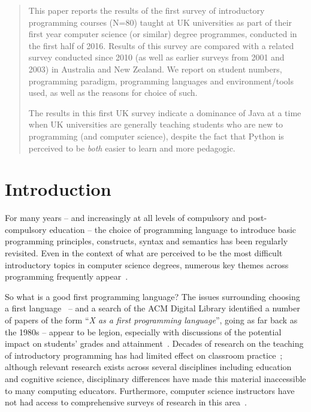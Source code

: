 \documentclass{sig-alternate}
\begin{document}
\maketitle

\begin{abstract}
This paper reports the results of the first survey of introductory
programming courses (N=80) taught at UK universities as part of their
first year computer science (or similar) degree programmes, conducted
in the first half of 2016. Results of this survey are compared with a
related survey conducted since 2010 (as well as earlier surveys from
2001 and 2003) in Australia and New Zealand. We report on student
numbers, programming paradigm, programming languages and
environment/tools used, as well as the reasons for choice of such.

The results in this first UK survey indicate a dominance of Java at a
time when UK universities are generally teaching students who are new
to programming (and computer science), despite the fact that Python is
perceived to be \emph{both} easier to learn and more pedagogic.

\end{abstract}


\section{Introduction}\label{intro}

For many years -- and increasingly at all levels of compulsory and
post-compulsory education -- the choice of programming language to
introduce basic programming principles, constructs, syntax and
semantics has been regularly revisited. Even in the context of what
are perceived to be the most difficult introductory topics in computer
science degrees, numerous key themes across programming frequently
appear~\cite{dale:2006}. 

So what is a good first programming language? The issues surrounding
choosing a first language~\cite{gupta:2004,kaplan:2010} -- and a
search of the ACM Digital Library identified a number of papers of the
form ``{\emph{X as a first programming language}}'', going as far back
as the 1980s -- appear to be legion, especially with discussions of
the potential impact on students' grades and
attainment~\cite{ivanovic-et-al:2015}. Decades of research on the
teaching of introductory programming has had limited effect on
classroom practice~\cite{pears-et-al:2007}; although relevant research
exists across several disciplines including education and cognitive
science, disciplinary differences have made this material inaccessible
to many computing educators. Furthermore, computer science instructors
have not had access to comprehensive surveys of research in this
area~\cite{mccracken-et-al:2001,pears-et-al:2007}.
\end{document}
